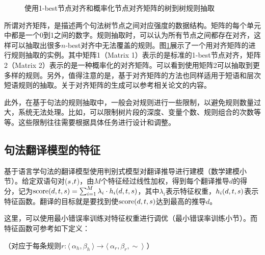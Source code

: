 \begin{figure}[htp]
\centering

\caption{使用1-best节点对齐和概率化节点对齐矩阵的树到树规则抽取}
\label{fig:8-36}
\end{figure}

\parinterval 所谓对齐矩阵，是描述两个句法树节点之间对应强度的数据结构。矩阵的每个单元中都是一个0到1之间的数字。规则抽取时，可以认为所有节点之间都存在对齐，这样可以抽取出很多$n$-best对齐中无法覆盖的规则。图\ref{fig:8-36}展示了一个用对齐矩阵的进行规则抽取的实例。其中矩阵1（Matrix 1）表示的是标准的1-best节点对齐，矩阵2（Matrix 2）表示的是一种概率化的对齐矩阵。可以看到使用矩阵2可以抽取到更多样的规则。另外，值得注意的是，基于对齐矩阵的方法也同样适用于短语和层次短语规则的抽取。关于对齐矩阵的生成可以参考相关论文的内容。

\parinterval 此外，在基于句法的规则抽取中，一般会对规则进行一些限制，以避免规则数量过大，系统无法处理。比如，可以限制树片段的深度、变量个数、规则组合的次数等等。这些限制往往需要根据具体任务进行设计和调整。


\subsection{句法翻译模型的特征}

\parinterval 基于语言学句法的翻译模型使用判别式模型对翻译推导进行建模（{\chapterseven}数学建模小节）。给定双语句对(${s}$,${t}$)，由$M$个特征经过线性加权，得到每个翻译推导$d$的得分，记为$\textrm{score(}d,{t},{s})=\sum_{i=1}^{M} \lambda_i \cdot h_{i}(d,{t},{s})$，其中$\lambda_i$表示特征权重，$h_{i}(d,{t},{s})$表示特征函数。翻译的目标就是要找到使$\textrm{score(}d,{t},{s})$达到最高的推导$d$。

\parinterval 这里，可以使用最小错误率训练对特征权重进行调优（{\chapterseven}最小错误率训练小节）。而特征函数可参考如下定义：

\vspace{0.5em}
（对应于每条规则$r : \langle\  \alpha_h, \beta_h\ \rangle \to \langle\ \alpha_r, \beta_r, \sim\ \rangle$ ）

